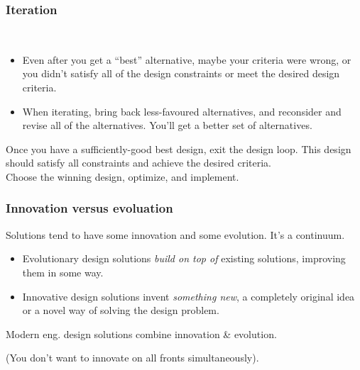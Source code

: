 \begin{frame}
\frametitle{Iteration}

\begin{changemargin}{1cm}
\\[1em]
\begin{itemize}
\item Even after you
get a ``best'' alternative, maybe your criteria were 
wrong, or you didn't satisfy all of the design constraints or meet
the desired design criteria.\\[1em]

\item When iterating, bring back less-favoured alternatives,
and reconsider and revise all of the alternatives. You'll get a better set
of alternatives.\\[1em]

\end{itemize}

Once you have a sufficiently-good best design, exit the
design loop. This design should satisfy all constraints and achieve the
desired criteria. \\[1em]

Choose the winning design, optimize, and implement.
\end{changemargin}

\end{frame}

\begin{frame}
\frametitle{Innovation versus evoluation}

\begin{changemargin}{1cm}
Solutions tend to have some
innovation and some evolution. It's a continuum.
\begin{itemize}
\item Evolutionary design solutions \emph{build on top of} existing solutions,
improving them in some way.
\item Innovative design solutions invent \emph{something new}, a completely
original idea or a novel way of solving the design problem.
\end{itemize}

Modern eng. design solutions combine innovation \& evolution.

(You don't want to innovate on all fronts simultaneously). 
\end{changemargin}

\end{frame}

